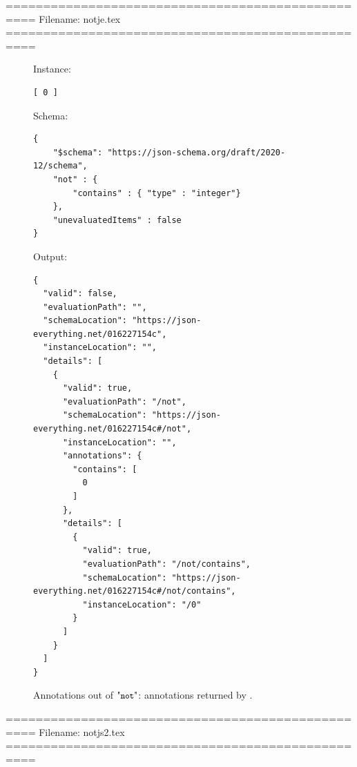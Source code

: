 ==================================================
Filename: notje.tex
==================================================

\begin{figure}
\small

Instance:
\begin{querybox}{}
\begin{lstlisting}[style=querynonumbers]
[ 0 ]
\end{lstlisting}
\end{querybox}


Schema:
\begin{querybox}{}
\begin{lstlisting}[style=query]
{
	"$schema": "https://json-schema.org/draft/2020-12/schema",
	"not" : {
	    "contains" : { "type" : "integer"}
	},
	"unevaluatedItems" : false
}
\end{lstlisting}
\end{querybox}
 
Output:
\begin{querybox}{}
\begin{lstlisting}[style=query]
{
  "valid": false,
  "evaluationPath": "",
  "schemaLocation": "https://json-everything.net/016227154c",
  "instanceLocation": "",
  "details": [
    {
      "valid": true,
      "evaluationPath": "/not",
      "schemaLocation": "https://json-everything.net/016227154c#/not",
      "instanceLocation": "",
      "annotations": {
        "contains": [
          0
        ]
      },
      "details": [
        {
          "valid": true,
          "evaluationPath": "/not/contains",
          "schemaLocation": "https://json-everything.net/016227154c#/not/contains",
          "instanceLocation": "/0"
        }
      ]
    }
  ]
}
\end{lstlisting}
\end{querybox}

\caption{Annotations out of $\qnot$: annotations returned by {\JE}.}
\label{fig:notje}
\end{figure}



==================================================
Filename: notjs2.tex
==================================================


